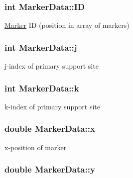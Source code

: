 \subsubsection[{\texorpdfstring{ID}{ID}}]{\setlength{\rightskip}{0pt plus 5cm}int Marker\+Data\+::\+ID}\hypertarget{class_marker_data_aae16e1f3245f8ef95ed6170e3775669d}{}\label{class_marker_data_aae16e1f3245f8ef95ed6170e3775669d}


\hyperlink{class_marker}{Marker} ID (position in array of markers) 

\subsubsection[{\texorpdfstring{j}{j}}]{\setlength{\rightskip}{0pt plus 5cm}int Marker\+Data\+::j}\hypertarget{class_marker_data_ae48473a1571656cf8f02403cb42a4adc}{}\label{class_marker_data_ae48473a1571656cf8f02403cb42a4adc}


j-\/index of primary support site 

\subsubsection[{\texorpdfstring{k}{k}}]{\setlength{\rightskip}{0pt plus 5cm}int Marker\+Data\+::k}\hypertarget{class_marker_data_a66183b4e9a166279551f4c180d0d71c8}{}\label{class_marker_data_a66183b4e9a166279551f4c180d0d71c8}


k-\/index of primary support site 

\subsubsection[{\texorpdfstring{x}{x}}]{\setlength{\rightskip}{0pt plus 5cm}double Marker\+Data\+::x}\hypertarget{class_marker_data_aade1e2f618efa75989831f028db027cd}{}\label{class_marker_data_aade1e2f618efa75989831f028db027cd}


x-\/position of marker 

\subsubsection[{\texorpdfstring{y}{y}}]{\setlength{\rightskip}{0pt plus 5cm}double Marker\+Data\+::y}\hypertarget{class_marker_data_a9b10ce07e886a94fc10e097b2cef2265}{}\label{class_marker_data_a9b10ce07e886a94fc10e097b2cef2265}


